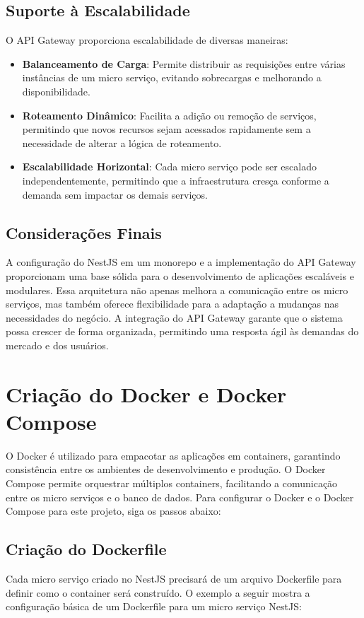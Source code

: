 \subsection{Suporte à Escalabilidade}
O API Gateway proporciona escalabilidade de diversas maneiras:

\begin{itemize}
    \item \textbf{Balanceamento de Carga}: Permite distribuir as requisições entre várias instâncias de um micro serviço, evitando sobrecargas e melhorando a disponibilidade.

    \item \textbf{Roteamento Dinâmico}: Facilita a adição ou remoção de serviços, permitindo que novos recursos sejam acessados rapidamente sem a necessidade de alterar a lógica de roteamento.

    \item \textbf{Escalabilidade Horizontal}: Cada micro serviço pode ser escalado independentemente, permitindo que a infraestrutura cresça conforme a demanda sem impactar os demais serviços.
\end{itemize}

\subsection{Considerações Finais}
A configuração do NestJS em um monorepo e a implementação do API Gateway proporcionam uma base sólida para o desenvolvimento de aplicações escaláveis e modulares. Essa arquitetura não apenas melhora a comunicação entre os micro serviços, mas também oferece flexibilidade para a adaptação a mudanças nas necessidades do negócio. A integração do API Gateway garante que o sistema possa crescer de forma organizada, permitindo uma resposta ágil às demandas do mercado e dos usuários.

\section{Criação do Docker e Docker Compose}

O Docker é utilizado para empacotar as aplicações em containers, garantindo consistência entre os ambientes de desenvolvimento e produção. O Docker Compose permite orquestrar múltiplos containers, facilitando a comunicação entre os micro serviços e o banco de dados. Para configurar o Docker e o Docker Compose para este projeto, siga os passos abaixo:

\subsection{Criação do Dockerfile}
Cada micro serviço criado no NestJS precisará de um arquivo Dockerfile para definir como o container será construído. O exemplo a seguir mostra a configuração básica de um Dockerfile para um micro serviço NestJS:

